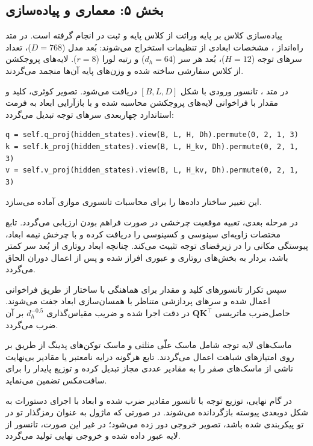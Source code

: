 \subsection*{بخش ۵: معماری و پیاده‌سازی }
پیاده‌سازی کلاس  بر پایه وراثت از کلاس پایه  و ثبت در  انجام گرفته است. در متد راه‌انداز ، مشخصات ابعادی از تنظیمات استخراج می‌شوند: بُعد مدل  ($D=768$)، تعداد سرهای توجه  ($H=12$)، بُعد هر سر  ($d_h=64$) و رتبه لورا  ($r=8$). لایه‌های پروجکشن از کلاس سفارشی  ساخته شده و وزن‌های پایه آن‌ها منجمد می‌گردند.

در متد ، تانسور ورودی با شکل $[B, L, D]$ دریافت می‌شود. تصویر کوئری، کلید و مقدار با فراخوانی لایه‌های پروجکشن محاسبه شده و با بازآرایی ابعاد به فرمت استاندارد چهاربعدی سرهای توجه تبدیل می‌گردد:
\begin{latin}
\begin{verbatim}
q = self.q_proj(hidden_states).view(B, L, H, Dh).permute(0, 2, 1, 3)
k = self.k_proj(hidden_states).view(B, L, H_kv, Dh).permute(0, 2, 1, 3)
v = self.v_proj(hidden_states).view(B, L, H_kv, Dh).permute(0, 2, 1, 3)
\end{verbatim}
\end{latin}
این تغییر ساختار داده‌ها را برای محاسبات تانسوری موازی آماده می‌سازد.

در مرحله بعدی، تعبیه موقعیت چرخشی  در صورت فراهم بودن ارزیابی می‌گردد. تابع  مختصات زاویه‌ای سینوسی و کسینوسی را دریافت کرده و با چرخش نیمه ابعاد، پیوستگی مکانی را در زیرفضای توجه تثبیت می‌کند. چنانچه ابعاد روتاری از بُعد سر کمتر باشد، بردار به بخش‌های روتاری و عبوری افراز شده و پس از اعمال دوران الحاق می‌گردد.

سپس تکرار تانسورهای کلید و مقدار برای هماهنگی با ساختار  از طریق فراخوانی  اعمال شده و سرهای پردازشی متناظر با همسان‌سازی ابعاد جفت می‌شوند. حاصل‌ضرب ماتریسی $\mathbf{Q} \mathbf{K}^\top$ در دقت  اجرا شده و ضریب مقیاس‌گذاری $d_h^{-0.5}$ بر آن ضرب می‌گردد.

ماسک‌های لایه توجه شامل ماسک علّی مثلثی و ماسک توکن‌های پدینگ از طریق  بر روی امتیازهای شباهت اعمال می‌گردند. تابع  هرگونه درایه نامعتبر یا مقادیر بی‌نهایت ناشی از ماسک‌های صفر را به مقادیر عددی مجاز تبدیل کرده و توزیع پایدار را برای سافت‌مکس تضمین می‌نماید.

در گام نهایی، توزیع توجه با تانسور مقادیر ضرب شده و ابعاد با اجرای دستورات  به شکل دوبعدی پیوسته بازگردانده می‌شوند. در صورتی که ماژول به عنوان رمزگذار تو در تو پیکربندی شده باشد، تصویر خروجی دور زده می‌شود؛ در غیر این صورت، تانسور از لایه  عبور داده شده و خروجی نهایی تولید می‌گردد.

